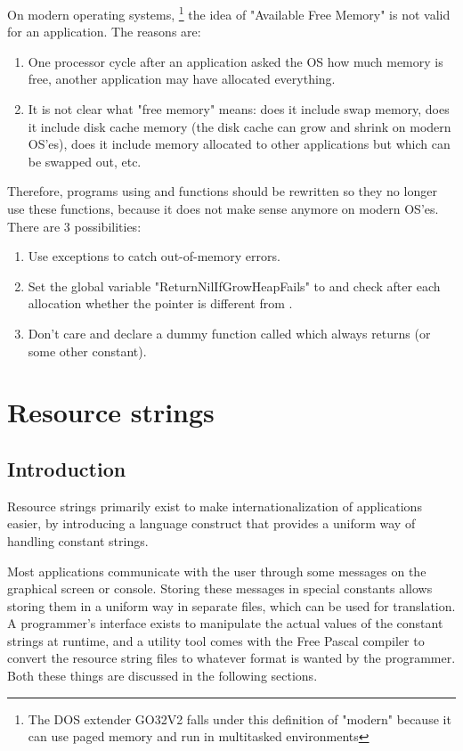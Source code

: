 On modern operating systems, \footnote{The DOS extender GO32V2 falls under this 
definition of "modern" because it can use paged memory and run in 
multitasked environments} the idea of "Available Free Memory" is not valid for an
application.
The reasons are:
\begin{enumerate} 
\item One processor cycle after an application asked the OS how much memory is free,
another application may have allocated everything.
\item It is not clear what "free memory" means: does it include swap memory,
does it include disk cache memory (the disk cache can grow and shrink on
modern OS'es), does it include memory allocated to other applications but
which can be swapped out, etc.
\end{enumerate}

Therefore, programs using  and  functions 
should be rewritten so they no longer use these functions, because
it does not make sense anymore on modern OS'es. There are 3 possibilities:
\begin{enumerate}
\item Use exceptions to catch out-of-memory errors.
\item Set the global variable "ReturnNilIfGrowHeapFails" to 
and check after each allocation whether the pointer is different from
.
\item Don't care and declare a dummy function called  
which always returns  (or some other constant).
\end{enumerate}


\chapter{Resource strings}
\label{resourcestrings}
\section{Introduction}
Resource strings primarily exist to make internationalization of
applications easier, by introducing a language construct that provides
a uniform way of handling constant strings.

Most applications communicate with the user through some messages on the
graphical screen or console. Storing these messages in special constants
allows storing them in a uniform way in separate files, which can be used
for translation. A programmer's interface exists to manipulate the actual
values of the constant strings at runtime, and a utility tool comes with the
Free Pascal compiler to convert the resource string files to whatever format
is wanted by the programmer. Both these things are discussed in the
following sections.


